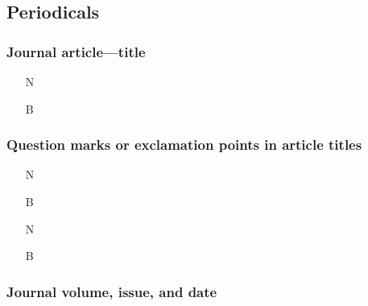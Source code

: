 \documentclass[11pt,letterpaper,oneside]{article}
\begin{document}


\setcounter{subsection}{1}
\subsection{Periodicals}
\setcounter{subsection}{14}

\setcounter{subsubsection}{175}
\subsubsection{Journal article---title}

\begin{itemize}
\item[N] 

\item[B] 
\end{itemize}

\setcounter{subsubsection}{177}
\subsubsection{Question marks or exclamation points in article titles}

\begin{itemize}
\item[N] 

\item[B] 

\item[N] 

\item[B] 
\end{itemize}

\setcounter{subsubsection}{179}
\subsubsection{Journal volume, issue, and date}
\end{document}
